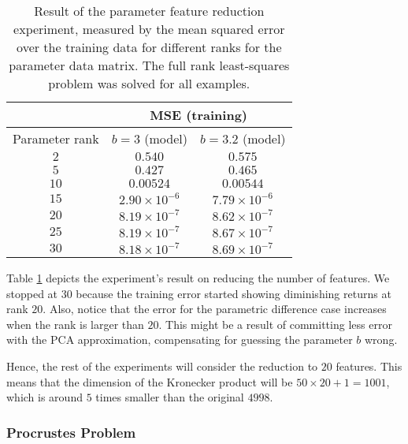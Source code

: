 \begin{table}[]
    \caption{Result of the parameter feature reduction experiment, measured by the mean squared error over the training data for different ranks for the parameter data matrix. The full rank least-squares problem was solved for all examples.}
    \label{tab:parred_result}
    \centering
    \begin{tabular}{|c|c|c|}
    \cline{2-3}
      \multicolumn{1}{c}{}  & \multicolumn{2}{|c|}{MSE (training)} \\\hline
      Parameter rank & $b = 3$ (model) & $b = 3.2$ (model) \\\hline
        $2$ & $0.540$ & $0.575$\\
        $5$ & $0.427$ & $0.465$\\
        $10$ & $0.00524$ & $0.00544$\\
        $15$ & $2.90 \times 10^{-6}$ & $7.79\times 10^{-6}$\\
        $20$ & $8.19\times 10^{-7}$ & $8.62\times 10^{-7}$\\
        $25$ & $8.19\times 10^{-7}$ & $8.67\times 10^{-7}$\\
        $30$ & $8.18\times 10^{-7}$ & $8.69\times 10^{-7}$ \\
        \hline
    \end{tabular}
    \end{table}
    
Table \ref{tab:parred_result} depicts the experiment's result on reducing the number of features.
%
We stopped at $30$ because the training error started showing diminishing returns at rank $20$.
%
Also, notice that the error for the parametric difference case increases when the rank is larger than $20$.
%
This might be a result of committing less error with the PCA approximation, compensating for guessing the parameter $b$ wrong.

Hence, the rest of the experiments will consider the reduction to $20$ features.
%
This means that the dimension of the Kronecker product will be $50\times 20 + 1 = 1001$, which is around $5$ times smaller than the original $4998$.

\color{black}

\subsubsection{Procrustes Problem} \label{subsec:procrustes}

